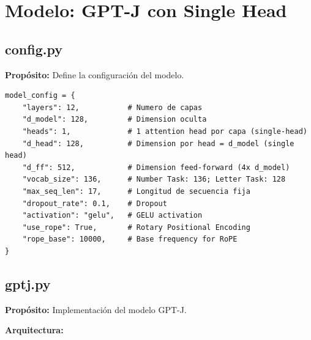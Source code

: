 \documentclass[12pt,a4paper]{report}
\begin{document}
\section{Modelo: GPT-J con Single Head}
\label{sec:modelo}

\subsection{config.py}
\label{subsec:config}

\textbf{Propósito:} Define la configuración del modelo.

\begin{lstlisting}
model_config = {
    "layers": 12,           # Numero de capas
    "d_model": 128,         # Dimension oculta
    "heads": 1,             # 1 attention head por capa (single-head)
    "d_head": 128,          # Dimension por head = d_model (single head)
    "d_ff": 512,            # Dimension feed-forward (4x d_model)
    "vocab_size": 136,      # Number Task: 136; Letter Task: 128
    "max_seq_len": 17,      # Longitud de secuencia fija
    "dropout_rate": 0.1,    # Dropout
    "activation": "gelu",   # GELU activation
    "use_rope": True,       # Rotary Positional Encoding
    "rope_base": 10000,     # Base frequency for RoPE
}
\end{lstlisting}

\subsection{gptj.py}
\label{subsec:gptj}

\textbf{Propósito:} Implementación del modelo GPT-J.

\textbf{Arquitectura:}
\end{document}
